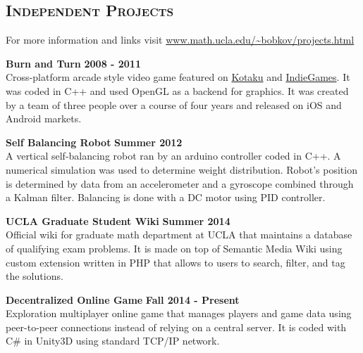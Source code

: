 \documentclass[margin, 10pt]{res} %
\begin{document}
\begin{resume}
 
\section{\textsc{Independent Projects}}
For more information and links visit \url{www.math.ucla.edu/~bobkov/projects.html}

\textbf{Burn and Turn} \hfill \textbf{2008 - 2011}\\
Cross-platform arcade style video game featured on \href{http://kotaku.com/5862197/burn-and-turn-combines-retro-arcade-stylings-with-tower-defense-for-combustible-fun}{Kotaku} and \href{http://indiegames.com/2011/10/trailer_burn_turn_robot_bear.html}{IndieGames}. It was coded in C++ and used OpenGL as a backend for graphics. It was created by a team of three people over a course of four years and released on iOS and Android markets.

\textbf{Self Balancing Robot} \hfill \textbf{Summer 2012}\\
A vertical self-balancing robot ran by an arduino controller coded in C++. A numerical simulation was used to determine weight distribution. Robot's position is determined by data from an accelerometer and a gyroscope combined through a Kalman filter. Balancing is done with a DC motor using PID controller.

\textbf{UCLA Graduate Student Wiki} \hfill \textbf{Summer 2014}\\
Official wiki for graduate math department at UCLA that maintains a database of qualifying exam problems. It is made on top of Semantic Media Wiki using custom extension written in PHP that allows to users to search, filter, and tag the solutions.

\textbf{Decentralized Online Game} \hfill \textbf{Fall 2014 - Present}\\
Exploration multiplayer online game that manages players and game data using peer-to-peer connections instead of relying on a central server. It is coded with C\# in Unity3D using standard TCP/IP network.

\end{resume}
\end{document}
